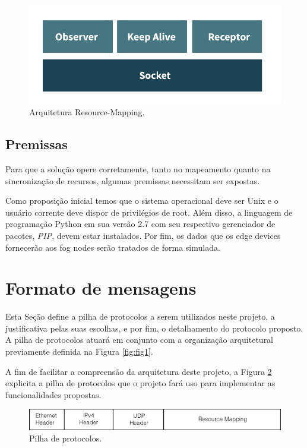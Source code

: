 \begin{figure}[H]
    \centering\includegraphics[width=.5\textwidth]{fig16.png}
    \caption%
    {\label{fig:fig16} Arquitetura Resource-Mapping.}
\end{figure}


\subsection{Premissas}

Para que a solução opere corretamente, tanto no mapeamento quanto na sincronização de recursos, algumas premissas necessitam ser expostas.

Como proposição inicial temos que o sistema operacional deve ser Unix e o usuário corrente deve dispor de privilégios de root.
Além disso, a linguagem de programação Python em sua versão 2.7 com seu respectivo gerenciador de pacotes, \textit{PIP}\cite{pip}, devem estar instalados.
Por fim, os dados que os edge devices fornecerão aos fog nodes serão tratados de forma simulada.


\section{Formato de mensagens}

Esta Seção define a pilha de protocolos a serem utilizados neste projeto, a justificativa pelas suas escolhas, e por fim, o detalhamento do protocolo proposto.
A pilha de protocolos atuará em conjunto com a organização arquitetural previamente definida na Figura \ref{fig:fig1}.

A fim de facilitar a compreensão da arquitetura deste projeto, a Figura \ref{fig:fig2} explicita a pilha de protocolos que o projeto fará uso para implementar as funcionalidades propostas.

\begin{figure}[htb!]
    \centering\includegraphics[width=.8\textwidth]{fig2.png}
    \caption%
    {\label{fig:fig2} Pilha de protocolos.}
\end{figure}

